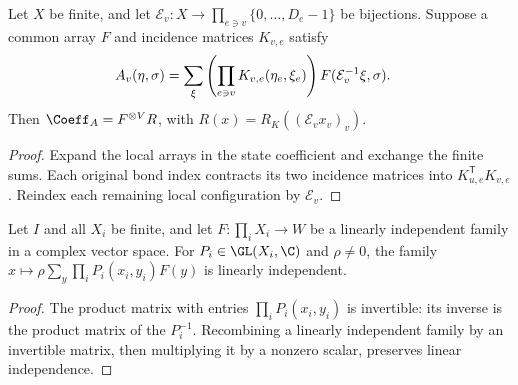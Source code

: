 \begin{lemma}%
    \label{thm:peps_independent_leg_physical_image}
    \leanok
    Let $X$ be finite, and let
    $\mathcal E_v:X\to\prod_{e\ni v}\{0,\ldots,D_e-1\}$ be bijections. Suppose a common array $F$ and incidence matrices $K_{v,e}$
    satisfy
    \begin{align}
        A_v(\eta,\sigma)
         & =\sum_\xi\left(\prod_{e\ni v}K_{v,e}(\eta_e,\xi_e)\right)
        F(\mathcal E_v^{-1}\xi,\sigma).\notag
    \end{align}
    Then $\Coeff_A=F^{\otimes V}R$, with
    $R(x)=R_K((\mathcal E_vx_v)_v)$.
\end{lemma}
\begin{proof}\leanok
    Expand the local arrays in the state coefficient and exchange the finite
    sums. Each original bond index contracts its two incidence matrices
    into $K_{u,e}^{\mathsf T}K_{v,e}$. Reindex each remaining local
    configuration by $\mathcal E_v$.
\end{proof}

\begin{lemma}%
    \label{thm:peps_invertible_leg_injectivity}
    \leanok
    Let $I$ and all $X_i$ be finite, and let
    $F:\prod_iX_i\to W$ be a linearly independent family in a complex
    vector space. For $P_i\in\GL(X_i,\C)$ and $\rho\ne0$, the family
    $x\mapsto\rho\sum_y\prod_iP_i(x_i,y_i)F(y)$ is linearly independent.
\end{lemma}
\begin{proof}\leanok
    The product matrix with entries $\prod_iP_i(x_i,y_i)$ is invertible:
    its inverse is the product matrix of the $P_i^{-1}$.
    Recombining a linearly independent family by an invertible matrix,
    then multiplying it by a nonzero scalar, preserves linear independence.
\end{proof}

